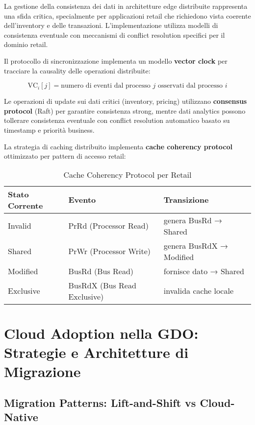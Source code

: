 La gestione della consistenza dei dati in architetture edge distribuite rappresenta una sfida critica, specialmente per applicazioni retail che richiedono vista coerente dell'inventory e delle transazioni. L'implementazione utilizza modelli di consistenza eventuale con meccanismi di conflict resolution specifici per il dominio retail.

Il protocollo di sincronizzazione implementa un modello \textbf{vector clock} per tracciare la causality delle operazioni distribuite:

\begin{equation}
\text{VC}_i[j] = \text{numero di eventi dal processo } j \text{ osservati dal processo } i
\label{eq:vector-clock}
\end{equation}

Le operazioni di update sui dati critici (inventory, pricing) utilizzano \textbf{consensus protocol} (Raft) per garantire consistenza strong, mentre dati analytics possono tollerare consistenza eventuale con conflict resolution automatico basato su timestamp e priorità business.

La strategia di caching distribuito implementa \textbf{cache coherency protocol} ottimizzato per pattern di accesso retail:

\begin{table}[h]
\centering
\caption{Cache Coherency Protocol per Retail}
\label{tab:cache-coherency}
\begin{tabular}{|l|l|l|}
\hline
\textbf{Stato Corrente} & \textbf{Evento} & \textbf{Transizione} \\
\hline
Invalid & PrRd (Processor Read) & genera BusRd → Shared \\
Shared & PrWr (Processor Write) & genera BusRdX → Modified \\
Modified & BusRd (Bus Read) & fornisce dato → Shared \\
Exclusive & BusRdX (Bus Read Exclusive) & invalida cache locale \\
\hline
\end{tabular}
\end{table}

\section{Cloud Adoption nella GDO: Strategie e Architetture di Migrazione}
\label{sec:cloud-adoption}

\subsection{Migration Patterns: Lift-and-Shift vs Cloud-Native}
\label{subsec:migration-patterns}

